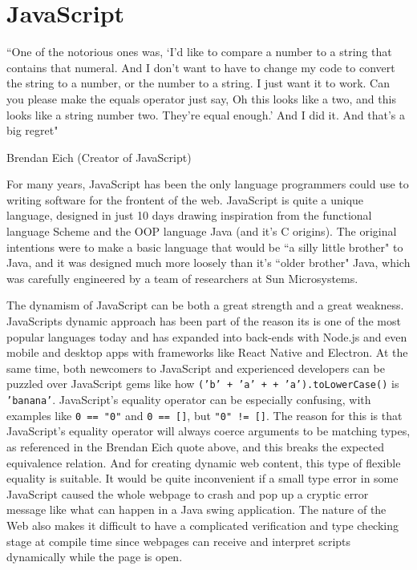 \documentclass[12pt,a4paper,twoside,openright]{report}
\begin{document}
\section{JavaScript}

\epigraph{“One of the notorious ones was, ‘I’d like to compare a number to a string that contains that numeral. And I don’t want to have to change my code to convert the string to a number, or the number to a string. I just want it to work. Can you please make the equals operator just say, Oh this looks like a two, and this looks like a string number two. They’re equal enough.’ And I did it. And that’s a big regret" \cite{jsorigins}}{Brendan Eich (Creator of JavaScript)}

For many years, JavaScript has been the only language programmers could use to writing software for the frontent of the web.
JavaScript is quite a unique language, designed in just 10 days drawing inspiration from the functional language Scheme and the OOP language Java (and it's C origins).
The original intentions were to make a basic language that would be ``a silly little brother"\cite{jsorigins} to Java, and it was designed much more loosely than it's ``older brother" Java, which was carefully engineered by a team of researchers at Sun Microsystems.

The dynamism of JavaScript can be both a great strength and a great weakness. JavaScripts dynamic approach has been part of the reason its is one of the most popular languages today and has expanded into back-ends with Node.js and even mobile and desktop apps with frameworks like React Native and Electron.
At the same time, both newcomers to JavaScript and experienced developers can be puzzled over JavaScript gems like how \mbox{\tt ('b' + 'a' + + 'a').toLowerCase()} is {\tt 'banana'}.
JavaScript's equality operator can be especially confusing, with examples like {\tt 0 == "0"} and {\tt 0 == []}, but {\tt "0" != []}.
The reason for this is that JavaScript's equality operator will always coerce arguments to be matching types, as referenced in the Brendan Eich quote above, and this breaks the expected equivalence relation.
And for creating dynamic web content, this type of flexible equality is suitable.
It would be quite inconvenient if a small type error in some JavaScript caused the whole webpage to crash and pop up a cryptic error message like what can happen in a Java swing application.
The nature of the Web also makes it difficult to have a complicated verification and type checking stage at compile time since webpages can receive and interpret scripts dynamically while the page is open.
\end{document}
